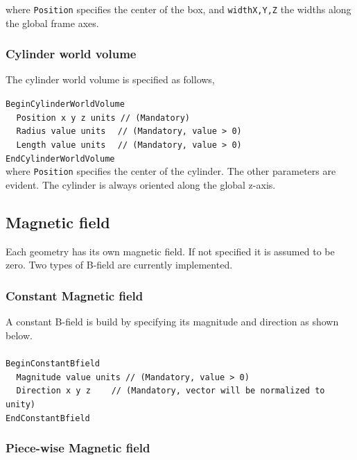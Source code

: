 \noindent
where {\tt Position} specifies the center of the box, and {\tt widthX,Y,Z} the widths along the global frame axes.

\subsubsection{Cylinder world volume}

The cylinder world volume is specified as follows,

\noindent
{\tt BeginCylinderWorldVolume} \\
$~~~~~${\tt Position   x   y   z  units  // (Mandatory)} \\
$~~~~~${\tt Radius     value  units  $~$ // (Mandatory, value > 0)} \\
$~~~~~${\tt Length     value  units  $~$ // (Mandatory, value > 0)} \\
{\tt EndCylinderWorldVolume} \\

\noindent
where {\tt Position} specifies the center of the cylinder. The other parameters are evident. The cylinder is always oriented along the 
global z-axis.

\subsection{Magnetic field}

Each geometry has its own magnetic field. If not specified it is assumed to be zero. Two types of B-field 
are currently implemented.

\subsubsection{Constant Magnetic field}

A constant B-field is build by specifying its magnitude and direction as shown below.
~\\
~\\
\noindent
{\tt BeginConstantBfield} \\
$~~~~~${\tt Magnitude    value  units      // (Mandatory, value > 0)} \\
$~~~~~${\tt Direction    x  y  z   $~~~~~$ // (Mandatory, vector will be normalized to unity)} \\
{\tt EndConstantBfield}

\subsubsection{Piece-wise Magnetic field}

